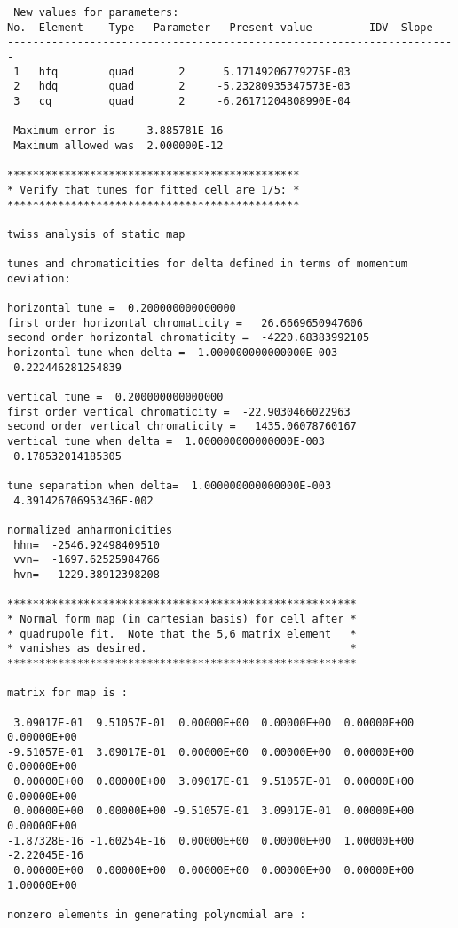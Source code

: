 \begin{footnotesize}
\begin{verbatim}
 New values for parameters:
No.  Element    Type   Parameter   Present value         IDV  Slope
-----------------------------------------------------------------------
 1   hfq        quad       2      5.17149206779275E-03
 2   hdq        quad       2     -5.23280935347573E-03
 3   cq         quad       2     -6.26171204808990E-04

 Maximum error is     3.885781E-16
 Maximum allowed was  2.000000E-12

**********************************************
* Verify that tunes for fitted cell are 1/5: *
**********************************************

twiss analysis of static map

tunes and chromaticities for delta defined in terms of momentum deviation:

horizontal tune =  0.200000000000000
first order horizontal chromaticity =   26.6669650947606
second order horizontal chromaticity =  -4220.68383992105
horizontal tune when delta =  1.000000000000000E-003
 0.222446281254839

vertical tune =  0.200000000000000
first order vertical chromaticity =  -22.9030466022963
second order vertical chromaticity =   1435.06078760167
vertical tune when delta =  1.000000000000000E-003
 0.178532014185305

tune separation when delta=  1.000000000000000E-003
 4.391426706953436E-002

normalized anharmonicities
 hhn=  -2546.92498409510
 vvn=  -1697.62525984766
 hvn=   1229.38912398208

*******************************************************
* Normal form map (in cartesian basis) for cell after *
* quadrupole fit.  Note that the 5,6 matrix element   *
* vanishes as desired.                                *
*******************************************************

matrix for map is :

 3.09017E-01  9.51057E-01  0.00000E+00  0.00000E+00  0.00000E+00  0.00000E+00
-9.51057E-01  3.09017E-01  0.00000E+00  0.00000E+00  0.00000E+00  0.00000E+00
 0.00000E+00  0.00000E+00  3.09017E-01  9.51057E-01  0.00000E+00  0.00000E+00
 0.00000E+00  0.00000E+00 -9.51057E-01  3.09017E-01  0.00000E+00  0.00000E+00
-1.87328E-16 -1.60254E-16  0.00000E+00  0.00000E+00  1.00000E+00 -2.22045E-16
 0.00000E+00  0.00000E+00  0.00000E+00  0.00000E+00  0.00000E+00  1.00000E+00

nonzero elements in generating polynomial are :


\end{verbatim}
\end{footnotesize}
